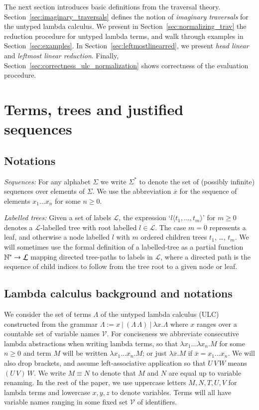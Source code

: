 \documentclass{elsarticle}
\theoremstyle{plain}
\theoremstyle{definition}
\theoremstyle{remark}
\newcommand\VarSet{\mathcal{V}}
\newcommand{\alphaequiv}{\equiv}
\begin{document}
The next section introduces basic definitions from the traversal theory. Section~\ref{sec:imaginary_traversals} defines the notion of \emph{imaginary traversals} for the untyped lambda calculus. We present in Section~\ref{sec:normalizing_trav} the reduction procedure for untyped lambda terms, and walk through examples in Section~\ref{sec:examples}. In Section~\ref{sec:leftmostlinearred}, we present \emph{head linear} and \emph{leftmost linear reduction}. Finally, Section~\ref{sec:correctness_ulc_normalization} shows correctness of the evaluation procedure.


\section{Terms, trees and justified sequences}
\label{sec:basic_def}
\subsection{Notations}
\emph{Sequences:} For any alphabet $\Sigma$ we write $\Sigma^*$ to denote the set of (possibly infinite) sequences over elements of $\Sigma$.
 We use the abbreviation $\overline{x}$ for the sequence of elements $x_1 \ldots x_n$ for some $n\geq0$.

 \emph{Labelled trees:} Given a set of labels $\mathcal{L}$, the expression `$l\langle t_1, \ldots, t_m \rangle$' for $m \geq 0$ denotes a $\mathcal{L}$-labelled tree with root labelled $l\in \mathcal{L}$. The case $m=0$ represents a leaf, and otherwise a node labelled $l$ with $m$ ordered children trees $t_1$, \ldots, $t_m$. We will sometimes use the formal definition of a labelled-tree as a partial function $\mathbb{N}^* \rightarrow \mathcal{L}$ mapping directed tree-paths to labels in $\mathcal{L}$, where a directed path is the sequence of child indices to follow from the tree root to a given node or leaf.

\subsection{Lambda calculus background and notations}
\label{sec:lambdacalculus_basics}

We consider the set of terms $\Lambda$ of the untyped lambda calculus (ULC) constructed from the grammar $\Lambda := x\ |\ (\Lambda\, \Lambda)\ |\ \lambda x. \Lambda $
where $x$ ranges over a countable set of variable names $\VarSet$.
For conciseness we abbreviate consecutive lambda abstractions when writing lambda terms, so that $\lambda x_1 \ldots \lambda x_n . M$ for some $n\geq 0$ and term $M$ will be written $\lambda x_1 \ldots x_n . M$; or just
$\lambda \overline{x} . M$ if $\overline{x} = x_1 \ldots x_n$.
We will also drop brackets, and assume left-associative application so that $U\,V\,W$ means $(U\,V)\,W$. We write $M \alphaequiv N$ to denote that $M$ and $N$ are equal up to variable renaming.
In the rest of the paper, we use uppercase letters $M, N, T, U, V$ for lambda terms and lowercase $x,y,z$ to denote variables. Terms will all have variable names ranging in some fixed set $\VarSet$ of identifiers.
\end{document}
